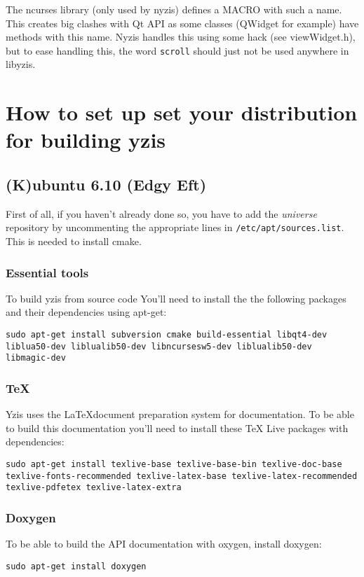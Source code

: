 \documentclass[a4paper,12pt]{report}
\begin{document}
The ncurses library (only used by nyzis) defines a MACRO with such a name.
This creates big clashes with Qt API as some classes (QWidget for example)
have methods with this name. Nyzis handles this using some hack (see
viewWidget.h), but to ease handling this, the word \verb+scroll+ should
just not be used anywhere in libyzis.

\appendix

\chapter{How to set up set your distribution for building yzis}

\section{(K)ubuntu 6.10 (Edgy Eft)}

First of all, if you haven't already done so, you have to add the
\emph{universe} repository by uncommenting the appropriate lines in
\texttt{/etc/apt/sources.list}. This is needed to install cmake.

\subsection{Essential tools}
To build yzis from source code You'll need to install the the following packages
and their dependencies using apt-get:

\texttt{sudo apt-get install subversion cmake build-essential libqt4-dev liblua50-dev
liblualib50-dev libncursesw5-dev liblualib50-dev libmagic-dev}

\subsection{\TeX}

Yzis uses the \LaTeX document preparation system for documentation. To be able
to build this documentation you'll need to install these \TeX{} Live packages
with dependencies:

\texttt{sudo apt-get install texlive-base texlive-base-bin texlive-doc-base
texlive-fonts-recommended texlive-latex-base texlive-latex-recommended
texlive-pdfetex texlive-latex-extra}

\subsection{Doxygen}
To be able to build the API documentation with oxygen, install doxygen:

\texttt{sudo apt-get install doxygen}
\end{document}
